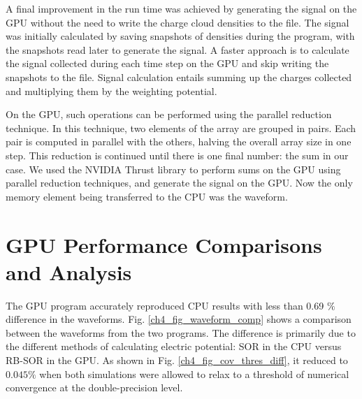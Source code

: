 A final improvement in the run time was achieved by generating the signal on the GPU without the need to write the charge cloud densities to the file. The signal was initially calculated by saving snapshots of densities during the program, with the snapshots read later to generate the signal. A faster approach is to calculate the signal collected during each time step on the GPU and skip writing the snapshots to the file. Signal calculation entails summing up the charges collected and multiplying them by the weighting potential. 



On the GPU, such operations can be performed using the parallel reduction technique. In this technique, two elements of the array are grouped in pairs. Each pair is computed in parallel with the others, halving the overall array size in one step. This reduction is continued until there is one final number: the sum in our case. We used the NVIDIA Thrust library to perform sums on the GPU using parallel reduction techniques, and generate the signal on the GPU. Now the only memory element being transferred to the CPU was the waveform.

\section{GPU Performance Comparisons and Analysis}

The GPU program accurately reproduced CPU results with less than 0.69 $\%$ difference in the waveforms. Fig. \ref{ch4_fig_waveform_comp} shows a comparison between the waveforms from the two programs. The difference is primarily due to the different methods of calculating electric potential: SOR in the CPU versus RB-SOR in the GPU. As shown in Fig. \ref{ch4_fig_cov_thres_diff}, it reduced to $0.045\%$ when both simulations were allowed to relax to a threshold of numerical convergence at the double-precision level.

